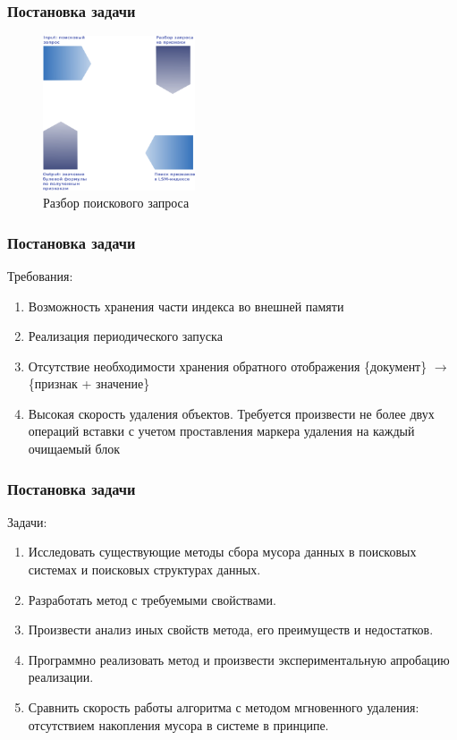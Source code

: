 \documentclass[aspectratio=169, pdf, 8pt, unicode]{beamer}
\begin{document}
\begin{frame}[fragile]
\frametitle{Постановка задачи}
\begin{figure}[H]
\centering
\includegraphics[width=0.4\textwidth]{fig/parser.png}
\caption{Разбор поискового запроса}
\end{figure}
\end{frame}

\begin{frame}[fragile]
\frametitle{Постановка задачи}
{\large Требования:}
\vspace{5mm}
\begin{enumerate}
\item Возможность хранения части индекса во внешней памяти
\vspace{5mm}
\item Реализация периодического запуска
\vspace{5mm}
\item Отсутствие необходимости хранения обратного отображения \{документ\} $\rightarrow$
    \{признак + значение\}
\vspace{5mm}
\item Высокая скорость удаления объектов. Требуется произвести не более двух операций
вставки с учетом проставления маркера удаления на каждый очищаемый блок
\end{enumerate}
\end{frame}

\begin{frame}[fragile]
    \frametitle{Постановка задачи}
    {\large Задачи:}
    \vspace{5mm}
    \begin{enumerate}
    \item Исследовать существующие методы сбора мусора данных в поисковых системах и поисковых структурах данных.
    \vspace{5mm}
    \item Разработать метод с требуемыми свойствами.
    \vspace{5mm}
    \item Произвести анализ иных свойств метода, его преимуществ и недостатков.
    \vspace{5mm}
    \item Программно реализовать метод и произвести экспериментальную апробацию реализации.
    \vspace{5mm}
    \item Сравнить скорость работы алгоритма с методом мгновенного удаления: отсутствием накопления
    мусора в системе в принципе.
    \end{enumerate}
    \end{frame}
\end{document}
